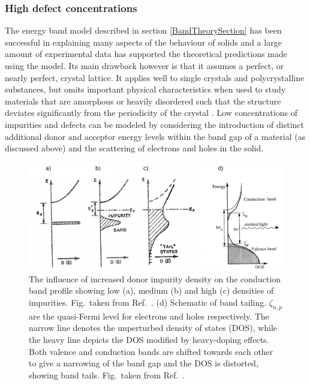 \documentclass[11pt, twoside]{report}
\begin{document}
\subsubsection{High defect concentrations}
The energy band model described in section \ref{BandTheorySection} has been successful in explaining many aspects of the behaviour of solids and a large amount of experimental data has supported the theoretical predictions made using the model. Its main drawback however is that it assumes a perfect, or nearly perfect, crystal lattice. It applies well to single crystals and polycrystalline substances, but omits important physical characteristics when used to study materials that are amorphous or heavily disordered such that the structure deviates significantly from the periodicity of the crystal \cite{small_semiconductor1}.
Low concentrations of impurities and defects can be modeled by considering the introduction of distinct additional donor and acceptor energy levels within the band gap of a material (as discussed above) and the scattering of electrons and holes in the solid. 
\begin{figure}[h!]
  \centering
    \includegraphics[width=1.0\textwidth]{figures/bs2+pankove.png}
    \caption[The influence of increased donor impurity density on the conduction band profile showing low (a), medium (b) and high (c) densities of impurities. (d) Schematic of band tailing. $\zeta_{n,p}$ are the quasi-Fermi level for electrons and holes respectively. The narrow line denotes the unperturbed density of states (DOS), while the heavy line depicts the DOS modified by heavy-doping effects. Both valence and conduction bands are shifted towards each other to give a narrowing of the band gap and the DOS is distorted, showing band tails.]{The influence of increased donor impurity density on the conduction band profile showing low (a), medium (b) and high (c) densities of impurities. Fig.~taken from Ref.~. (d) Schematic of band tailing. $\zeta_{n,p}$ are the quasi-Fermi level for electrons and holes respectively. The narrow line denotes the unperturbed density of states (DOS), while the heavy line depicts the DOS modified by heavy-doping effects. Both valence and conduction bands are shifted towards each other to give a narrowing of the band gap and the DOS is distorted, showing band tails. Fig.~taken from Ref.~.}
  \label{bs2}
\end{figure}
\end{document}
